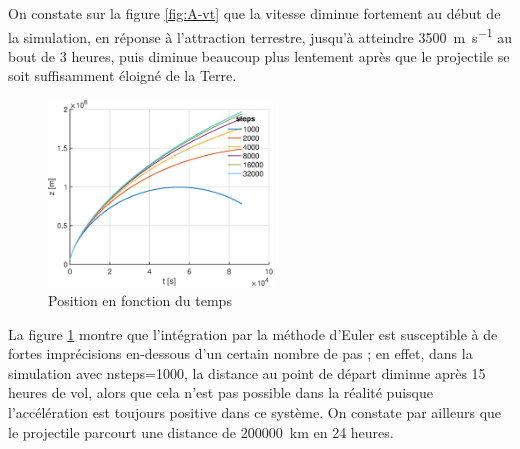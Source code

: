 \documentclass[a4paper,12pt,twoside]{article}
\begin{document}
On constate sur la figure \ref{fig:A-vt} que la vitesse diminue fortement au début de la simulation, en réponse à l'attraction terrestre, jusqu'à atteindre \SI{3500}{\meter\per\second} au bout de 3 heures, puis diminue beaucoup plus lentement après que le projectile se soit suffisamment éloigné de la Terre.\\

\begin{figure}[h]
	\centering
	\includegraphics[width=0.53\textwidth]{graphs/zA.eps}
	\caption{Position en fonction du temps}
	\label{fig:A-zt}
\end{figure}

La figure \ref{fig:A-zt} montre que l'intégration par la méthode d'Euler est susceptible à de fortes imprécisions en-dessous d'un certain nombre de pas ;
en effet, dans la simulation avec nsteps=1000, la distance au point de départ diminue après 15 heures de vol, alors que cela n'est pas possible dans la réalité puisque l'accélération est toujours positive dans ce système.
On constate par ailleurs que le projectile parcourt une distance de \SI{200000}{\kilo\meter} en 24 heures.\\
\end{document}
